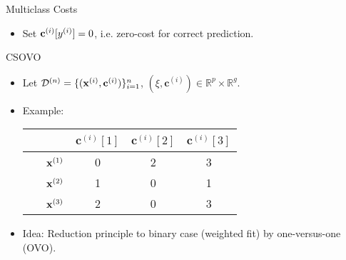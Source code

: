 \documentclass[11pt,compress,t,notes=noshow, xcolor=table]{beamer}
\newcommand{\cv}{\mathbf{c}}    %
\begin{document}
\begin{vbframe}{Multiclass Costs}
\begin{itemize}
        \item Set $\cv^{(i)}[\yi] = 0$, i.e. zero-cost for correct prediction.
        \vspace{5pt}
        
            
    \end{itemize}
\end{vbframe}

\begin{vbframe}{CSOVO \href{https://proceedings.mlr.press/v39/lin14.pdf}{}}
    

    \begin{itemize}
        \item Let $\D^{(n)} = \{(\xi, \cv^{(i)})\}_{i=1}^n$, $(\xi, \cv^{(i)}) \in \mathbb{R}^p \times \mathbb{R}^g$. 
        \vspace{5pt}    
        \item Example:
        \vspace{5pt}

                        \begin{center}
                            \begin{tabular}{cc|ccc}\
        			& & $\cv^{(i)}[1]$ & $\cv^{(i)}[2]$ & $\cv^{(i)}[3]$  \\
        			\hline & $\mathbf{x}^{(1)}$ & 0 & 2 & 3\\
        			& $\mathbf{x}^{(2)}$ & 1 & 0 & 1\\
                 	& $\mathbf{x}^{(3)}$ & 2 & 0 & 3\\
                \end{tabular}
        \end{center}
        
        \vspace{5pt}
        \vspace{5pt}
        
        \item Idea: Reduction principle to binary case (weighted fit) by one-versus-one (OVO). 
        

\end{itemize}
\end{vbframe}
\end{document}
